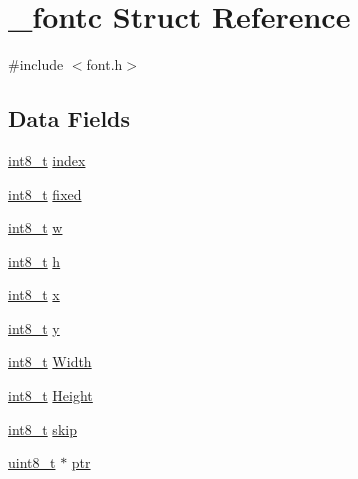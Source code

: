 \hypertarget{struct__fontc}{\section{\-\_\-fontc Struct Reference}
\label{struct__fontc}
}


{\ttfamily \#include $<$font.\-h$>$}

\subsection*{Data Fields}
\begin{DoxyCompactItemize}
\item 
\hyperlink{earth2wireframe_8c_aef44329758059c91c76d334e8fc09700}{int8\-\_\-t} \hyperlink{struct__fontc_a7cc0370744ff7ea964054d36917c9a2f}{index}
\item 
\hyperlink{earth2wireframe_8c_aef44329758059c91c76d334e8fc09700}{int8\-\_\-t} \hyperlink{struct__fontc_aec700f6ada95d1bced81fc2728633878}{fixed}
\item 
\hyperlink{earth2wireframe_8c_aef44329758059c91c76d334e8fc09700}{int8\-\_\-t} \hyperlink{struct__fontc_a9c2af0354d2b2009e7b6684e25fd479b}{w}
\item 
\hyperlink{earth2wireframe_8c_aef44329758059c91c76d334e8fc09700}{int8\-\_\-t} \hyperlink{struct__fontc_a9feb8c838dfc1d4eebb15c8e53981944}{h}
\item 
\hyperlink{earth2wireframe_8c_aef44329758059c91c76d334e8fc09700}{int8\-\_\-t} \hyperlink{struct__fontc_ad15d00ed46ebe52a085cf05b5ca5da90}{x}
\item 
\hyperlink{earth2wireframe_8c_aef44329758059c91c76d334e8fc09700}{int8\-\_\-t} \hyperlink{struct__fontc_aebbde0dc41068722ee1a69f4a56478a4}{y}
\item 
\hyperlink{earth2wireframe_8c_aef44329758059c91c76d334e8fc09700}{int8\-\_\-t} \hyperlink{struct__fontc_ae3c802e1c35ae9a4e37c8eb2e9644325}{Width}
\item 
\hyperlink{earth2wireframe_8c_aef44329758059c91c76d334e8fc09700}{int8\-\_\-t} \hyperlink{struct__fontc_a98f97c237dfb1027c38813a17ef6dcd6}{Height}
\item 
\hyperlink{earth2wireframe_8c_aef44329758059c91c76d334e8fc09700}{int8\-\_\-t} \hyperlink{struct__fontc_a44c94e91afa006cb2ffe55a99b3e2d3c}{skip}
\item 
\hyperlink{send_8c_aba7bc1797add20fe3efdf37ced1182c5}{uint8\-\_\-t} $\ast$ \hyperlink{struct__fontc_a60a3fef5ccd80dff543aac3f22f74876}{ptr}
\end{DoxyCompactItemize}


